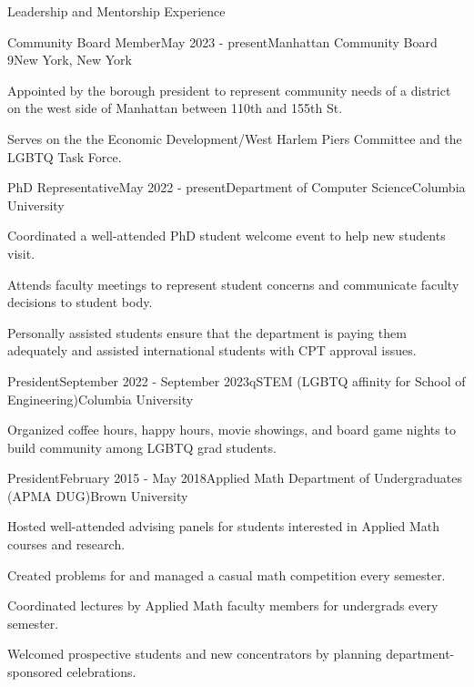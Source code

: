\documentclass{cv} %
\begin{document}
\begin{rSection}{Leadership and Mentorship Experience}

\begin{rSubsection}{Community Board Member}{May 2023 - present}{Manhattan Community Board 9}{New York, New York}
\item Appointed by the borough president to represent community needs of a district on the west side of Manhattan between 110th and 155th St. 
\item Serves on the the Economic Development/West Harlem Piers Committee and the LGBTQ Task Force.
\end{rSubsection}


\begin{rSubsection}{PhD Representative}{May 2022 - present}{Department of Computer Science}{Columbia University}
\item Coordinated a well-attended PhD student welcome event to help new students visit.
\item Attends faculty meetings to represent student concerns and communicate faculty decisions to student body.
\item Personally assisted students ensure that the department is paying them adequately and assisted international students with CPT approval issues.
\end{rSubsection}

\begin{rSubsection}{President}{September 2022 - September 2023}{qSTEM (LGBTQ affinity for School of Engineering)}{Columbia University}
\item Organized coffee hours, happy hours, movie showings, and board game nights to build community among LGBTQ grad students.
\end{rSubsection}


\begin{rSubsection}{President}{February 2015 - May 2018}{Applied Math Department of Undergraduates (APMA DUG)}{Brown University}
\item Hosted well-attended advising panels for students interested in Applied Math courses and research.
\item Created problems for and managed a casual math competition every semester.
\item Coordinated lectures by Applied Math faculty members for undergrads every semester.
\item Welcomed prospective students and new concentrators by planning department-sponsored celebrations.
\end{rSubsection}


\end{rSection}
\end{document}
